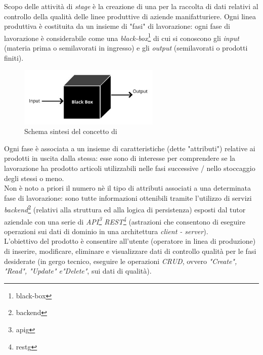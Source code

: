 Scopo delle attività di \textit{stage} è la creazione di una  per la raccolta di dati relativi al controllo della qualità delle linee produttive di aziende manifatturiere.
Ogni linea produttiva è costituita da un insieme di "fasi" di lavorazione: ogni fase di lavorazione è considerabile come una \textit{black-box}\footnote{\gls{black-box}} di cui si conoscono gli \textit{input} (materia prima o semilavorati in ingresso)
e gli \textit{output} (semilavorati o prodotti finiti).
\begin{figure}[H]
    \centering
    \includegraphics[width=0.6\textwidth]{images/black-box.png}
    \caption[Schema sintesi del concetto di \textit{black-box}]{Schema sintesi del concetto di  \footnotemark}
\end{figure}
Ogni fase è associata a un insieme di caratteristiche (dette "attributi") relative ai prodotti in uscita dalla stessa: esse sono di interesse per comprendere se la lavorazione ha prodotto articoli utilizzabili nelle fasi successive / nello stoccaggio degli stessi o meno. \\
Non è noto a priori il numero nè il tipo di attributi associati a una determinata fase di lavorazione: sono tutte informazioni ottenibili tramite l'utilizzo di servizi \textit{backend}\footnote{\gls{backend}} (relativi alla struttura ed alla logica di persistenza) esposti dal tutor aziendale con una
serie di \textit{API\footnote{\gls{apig}} REST\footnote{\gls{restg}}} (astrazioni che consentono di eseguire operazioni sui dati di dominio in una architettura \textit{client - server}). \\
L'obiettivo del prodotto è consentire all'utente (operatore in linea di produzione) di inserire, modificare, eliminare e visualizzare dati di controllo qualità per le fasi desiderate (in gergo tecnico, eseguire le operazioni \textit{CRUD}, ovvero \textit{"Create", "Read", "Update" e"Delete"}, sui dati di qualità).

